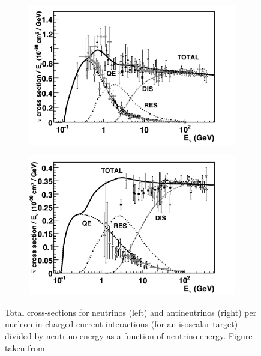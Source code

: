 \begin{figure}[h!]
        \begin{subfigure}[h]{0.7\textwidth}
            \includegraphics{./figures/nu_phenomenology/cc_inclusive_nu.pdf}
        \end{subfigure}
        \hfill
        \begin{subfigure}[h]{0.7\textwidth}
            \includegraphics{./figures/nu_phenomenology/cc_inclusive_nubar.pdf}
        \end{subfigure}
        
        \caption[Total cross-sections for neutrinos and antineutrinos]{Total cross-sections for neutrinos (left) and antineutrinos (right) per nucleon in charged-current interactions (for an isoscalar target) divided by neutrino energy as a function of neutrino energy. Figure taken from \cite{xsec_overview} }
\end{figure}


